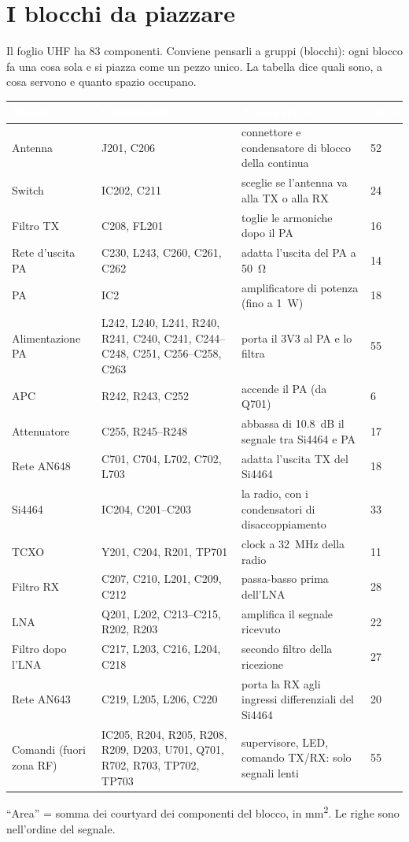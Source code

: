 \documentclass[a4paper,11pt]{article}
\newcommand{\tabhead}{\rowcolor{sbblue}}
\newcommand{\hd}[1]{\textcolor{white}{\sffamily\bfseries\footnotesize #1}}
\begin{document}
\section{I blocchi da piazzare}
Il foglio UHF ha 83 componenti. Conviene pensarli a gruppi (blocchi): ogni blocco fa una cosa sola e si piazza come un pezzo unico. La tabella dice quali sono, a cosa servono e quanto spazio occupano.

{\small
{}
\begin{xltabular}{\linewidth}{@{}L{25mm}L{52mm}Y L{14mm}@{}}
\tabhead\hd{Blocco}&\hd{Componenti}&\hd{A cosa serve}&\hd{Area}\\
\endhead
Antenna & J201, C206 & connettore e condensatore di blocco della continua & 52\\
Switch & IC202, C211 & sceglie se l'antenna va alla TX o alla RX & 24\\
Filtro TX & C208, FL201 & toglie le armoniche dopo il PA & 16\\
Rete d'uscita PA & C230, L243, C260, C261, C262 & adatta l'uscita del PA a \SI{50}{\ohm} & 14\\
PA & IC2 & amplificatore di potenza (fino a \SI{1}{\watt}) & 18\\
Alimentazione PA & L242, L240, L241, R240, R241, C240, C241, C244--C248, C251, C256--C258, C263 & porta il 3V3 al PA e lo filtra & 55\\
APC & R242, R243, C252 & accende il PA (da Q701) & 6\\
Attenuatore & C255, R245--R248 & abbassa di \SI{10.8}{dB} il segnale tra Si4464 e PA & 17\\
Rete AN648 & C701, C704, L702, C702, L703 & adatta l'uscita TX del Si4464 & 18\\
Si4464 & IC204, C201--C203 & la radio, con i condensatori di disaccoppiamento & 33\\
TCXO & Y201, C204, R201, TP701 & clock a \SI{32}{\mega\hertz} della radio & 11\\
Filtro RX & C207, C210, L201, C209, C212 & passa-basso prima dell'LNA & 28\\
LNA & Q201, L202, C213--C215, R202, R203 & amplifica il segnale ricevuto & 22\\
Filtro dopo l'LNA & C217, L203, C216, L204, C218 & secondo filtro della ricezione & 27\\
Rete AN643 & C219, L205, L206, C220 & porta la RX agli ingressi differenziali del Si4464 & 20\\
Comandi (fuori zona RF) & IC205, R204, R205, R208, R209, D203, U701, Q701, R702, R703, TP702, TP703 & supervisore, LED, comando TX/RX: solo segnali lenti & 55\\
\bottomrule
\end{xltabular}}
{\footnotesize \enquote{Area} = somma dei courtyard dei componenti del blocco, in \si{mm^2}. Le righe sono nell'ordine del segnale.}
\end{document}
